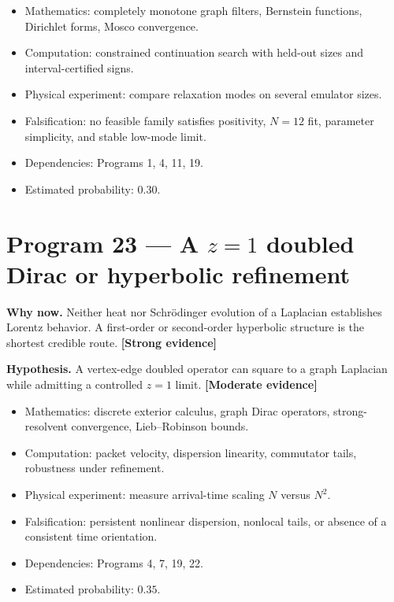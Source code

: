 \documentclass[11pt,a4paper,openany]{report}
\newcommand{\statusStrong}{\textcolor{finblue}{[Strong evidence]}}
\newcommand{\statusModerate}{\textcolor{finviolet}{[Moderate evidence]}}
\begin{document}
\begin{itemize}
\item 
Mathematics: completely monotone graph filters, Bernstein functions, Dirichlet forms, Mosco convergence.

\item 
Computation: constrained continuation search with held-out sizes and interval-certified signs.

\item 
Physical experiment: compare relaxation modes on several emulator sizes.

\item 
Falsification: no feasible family satisfies positivity, \(N=12\) fit, parameter simplicity, and stable low-mode limit.

\item 
Dependencies: Programs 1, 4, 11, 19.

\item 
Estimated probability: \(0.30\).

\end{itemize}

\section{\texorpdfstring{Program 23 — A \(z=1\) doubled Dirac or hyperbolic refinement}{Program 23 — A z=1 doubled Dirac or hyperbolic refinement}}

\textbf{Why now.} Neither heat nor Schrödinger evolution of a Laplacian establishes Lorentz behavior. A first-order or second-order hyperbolic structure is the shortest credible route. \textbf{\statusStrong{}}

\textbf{Hypothesis.} A vertex-edge doubled operator can square to a graph Laplacian while admitting a controlled \(z=1\) limit. \textbf{\statusModerate{}}

\begin{itemize}
\item 
Mathematics: discrete exterior calculus, graph Dirac operators, strong-resolvent convergence, Lieb–Robinson bounds.

\item 
Computation: packet velocity, dispersion linearity, commutator tails, robustness under refinement.

\item 
Physical experiment: measure arrival-time scaling \(N\) versus \(N^2\).

\item 
Falsification: persistent nonlinear dispersion, nonlocal tails, or absence of a consistent time orientation.

\item 
Dependencies: Programs 4, 7, 19, 22.

\item 
Estimated probability: \(0.35\).

\end{itemize}
\end{document}
